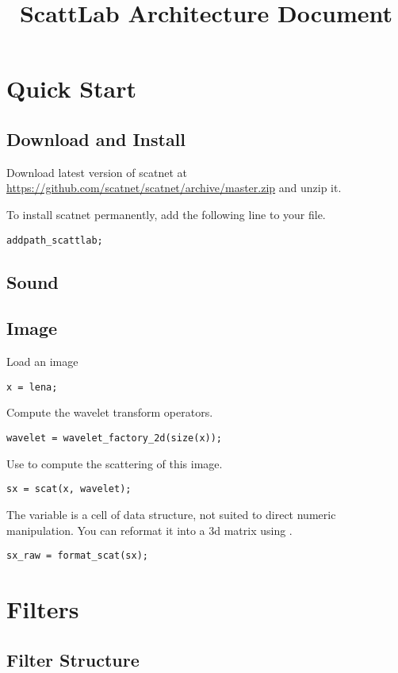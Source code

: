 \documentclass[twocolumn]{article}
\title{ScattLab Architecture Document}
\begin{document}
	
\maketitle

\section{Quick Start}
\subsection{Download and Install}
Download latest version of scatnet at \url{https://github.com/scatnet/scatnet/archive/master.zip} and unzip it.

To install scatnet permanently, add the following line to your  file.
\begin{lstlisting}
addpath_scattlab;
\end{lstlisting}
\subsection{Sound}

\subsection{Image}
Load an image
\begin{lstlisting}
x = lena;
\end{lstlisting}
Compute the wavelet transform operators.
\begin{lstlisting}
wavelet = wavelet_factory_2d(size(x));
\end{lstlisting}
Use  to compute the scattering of this image.
\begin{lstlisting}
sx = scat(x, wavelet);
\end{lstlisting}
The variable  is a cell of data structure, not suited to direct numeric manipulation. You can reformat it into a 3d matrix using .
\begin{lstlisting}
sx_raw = format_scat(sx);
\end{lstlisting}

\section{Filters}

\subsection{Filter Structure}
\end{document}
